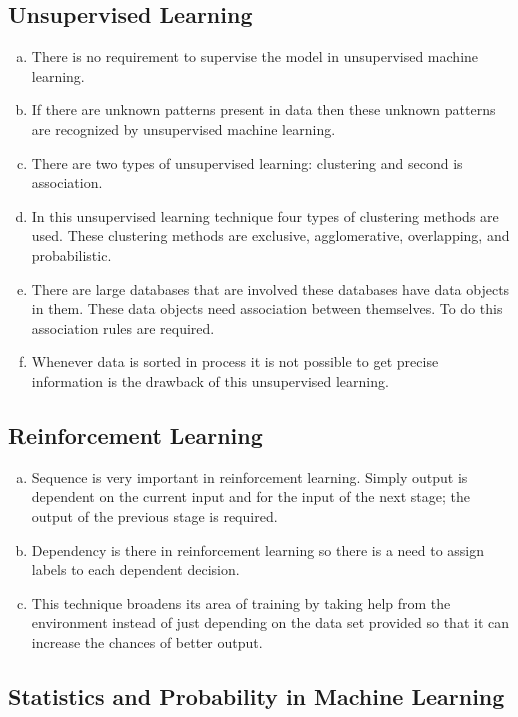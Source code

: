 \subsection{Unsupervised Learning}

\begin{enumerate}[a)]
    \item There is no requirement to supervise the model in unsupervised machine learning.
    \item If there are unknown patterns present in data then these unknown patterns are recognized by unsupervised machine learning.
    \item There are two types of unsupervised learning: clustering and second is association.
    \item In this unsupervised learning technique four types of clustering methods are used. These clustering methods are exclusive, agglomerative, overlapping, and probabilistic.
    \item There are large databases that are involved these databases have data objects in them. These data objects need association between themselves. To do this association rules are required.
    \item Whenever data is sorted in process it is not possible to get precise information is the drawback of this unsupervised learning.
\end{enumerate}

\subsection{Reinforcement Learning}

\begin{enumerate}[a)]
    \item Sequence is very important in reinforcement learning. Simply output is dependent on the current input and for the input of the next stage; the output of the previous stage is required.
    \item Dependency is there in reinforcement learning so there is a need to assign labels to each dependent decision.
    \item This technique broadens its area of training by taking help from the environment instead of just depending on the data set provided so that it can increase the chances of better output.
\end{enumerate}

\subsection{ Statistics and Probability in Machine Learning}

